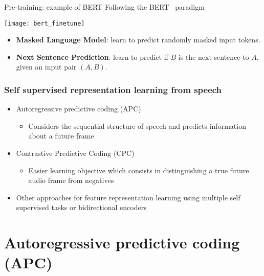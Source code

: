 \documentclass[table]{beamer}
\begin{document}
\begin{frame}{Pre-training: example of BERT}{}	
Following the BERT~\cite{bert} paradigm
\begin{center}
	\texttt{[image: bert\_finetune]}
\end{center}
	\begin{itemize}
		\item \textbf{Masked Language Model}: learn to predict randomly masked input tokens.
		\item \textbf{Next Sentence Prediction}: learn to predict if $B$ is the next sentence to $A$, given an input pair $(A,B)$. 
	\end{itemize}

\end{frame}









\begin{frame}
\frametitle{Self supervised representation learning from speech}
\begin{itemize}
	\item Autoregressive predictive coding (APC) \citep{DBLP:journals/corr/abs-1904-03240,chung2020improved}
		\begin{itemize}
		\item Considers the sequential structure of speech and predicts information about a future frame
		\end{itemize}
	\item Contrastive Predictive Coding (CPC) \citep{Baevski, Schneider2019,morgane}
		\begin{itemize}
		\item Easier learning objective which consists in distinguishing a true future audio frame from negatives
		\end{itemize}	
	\item Other approaches for feature representation learning using multiple self supervised tasks \citep{pascual2019,ravanelli2020multitask} or bidirectional encoders \citep{song2019speechxlnet,Liu_2020, wang2020unsupervised}
\end{itemize} 
\end{frame}






\section{Autoregressive predictive coding (APC)}
\end{document}
